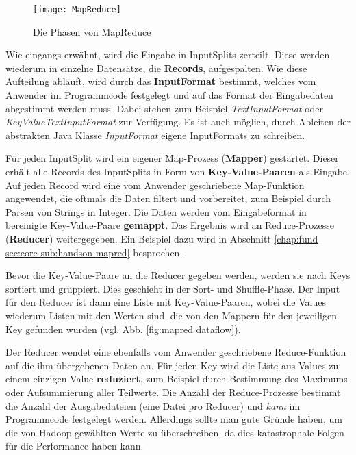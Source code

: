 \begin{figure}[ht]
    \centering
    \texttt{[image: MapReduce]}
    \caption[Die Phasen von MapReduce]{Die Phasen von MapReduce\parencite[Seite 34, Figure 2-4]{white_hadoop_2015}}
    \label{fig:mapred}
\end{figure}
Wie eingangs erwähnt, wird die Eingabe in InputSplits zerteilt. Diese werden wiederum in einzelne Datensätze, die \textbf{Records}, aufgespalten. Wie diese Aufteilung abläuft, wird durch das \textbf{InputFormat} bestimmt, welches vom Anwender im Programmcode festgelegt und auf das Format der Eingabedaten abgestimmt werden muss. Dabei stehen zum Beispiel \textit{TextInputFormat} oder \textit{KeyValueTextInputFormat} zur Verfügung. Es ist auch möglich, durch Ableiten der abstrakten Java Klasse \textit{InputFormat} eigene InputFormats zu schreiben.\cite{white_hadoop_2015}
\par
Für jeden InputSplit wird ein eigener Map-Prozess (\textbf{Mapper}) gestartet. Dieser erhält alle Records des InputSplits in Form von \textbf{Key-Value-Paaren} als Eingabe. Auf jeden Record wird eine vom Anwender geschriebene Map-Funktion angewendet, die oftmals die Daten filtert und vorbereitet, zum Beispiel durch Parsen von Strings in Integer. Die Daten werden vom Eingabeformat in bereinigte Key-Value-Paare \textbf{gemappt}. Das Ergebnis wird an Reduce-Prozesse (\textbf{Reducer}) weitergegeben. Ein Beispiel dazu wird in Abschnitt \ref{chap:fund sec:core sub:handson mapred} besprochen.
\par
Bevor die Key-Value-Paare an die Reducer gegeben werden, werden sie nach Keys sortiert und gruppiert. Dies geschieht in der Sort- und Shuffle-Phase. Der Input für den Reducer ist dann eine Liste mit Key-Value-Paaren, wobei die Values wiederum Listen mit den Werten sind, die von den Mappern für den jeweiligen Key gefunden wurden (vgl. Abb. \ref{fig:mapred dataflow}). 
\par
Der Reducer wendet eine ebenfalls vom Anwender geschriebene Reduce-Funktion auf die ihm übergebenen Daten an. Für jeden Key wird die Liste aus Values zu einem einzigen Value \textbf{reduziert}, zum Beispiel durch Bestimmung des Maximums oder Aufsummierung aller Teilwerte. Die Anzahl der Reduce-Prozesse bestimmt die Anzahl der Ausgabedateien (eine Datei pro Reducer) und \textit{kann} im Programmcode festgelegt werden. Allerdings sollte man gute Gründe haben, um die von Hadoop gewählten Werte zu überschreiben, da dies katastrophale Folgen für die Performance haben kann.\cite{infrabot_howmanymapsandreduces_2019} 

